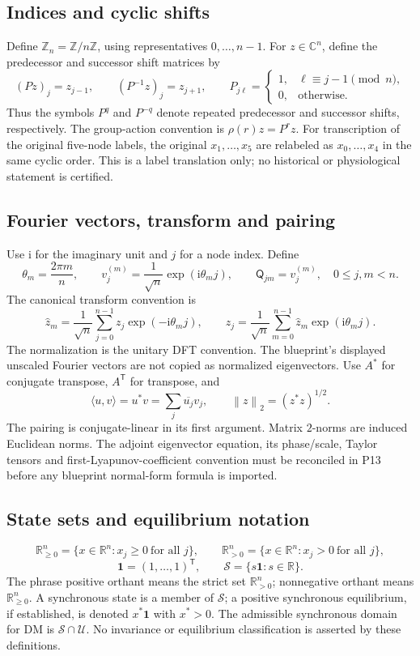 \documentclass[11pt]{article}
\newcommand{\R}{\mathbb{R}}
\newcommand{\C}{\mathbb{C}}
\newcommand{\Z}{\mathbb{Z}}
\newcommand{\Zn}{\mathbb{Z}_n}
\newcommand{\one}{\mathbf{1}}
\newcommand{\ii}{\mathrm{i}}
\newcommand{\DM}{\mathrm{DM}}
\newcommand{\Sync}{\mathcal{S}}
\newcommand{\Orth}{\R_{\geq 0}^{n}}
\newcommand{\PosOrth}{\R_{>0}^{n}}
\newcommand{\Domain}{\mathcal{U}}
\newcommand{\Fourier}{\mathsf{Q}}
\newcommand{\inner}[2]{\langle #1,#2\rangle}
\newcommand{\norm}[1]{\left\lVert #1\right\rVert}
\theoremstyle{definition}
\theoremstyle{remark}
\begin{document}
\subsection{Indices and cyclic shifts}
Define $\Zn=\Z/n\Z$, using representatives $0,\ldots,n-1$.
For $z\in\C^n$, define the predecessor and successor shift matrices by
\[
(Pz)_j=z_{j-1},\qquad(P^{-1}z)_j=z_{j+1},\qquad
P_{j\ell}=\begin{cases}1,&\ell\equiv j-1\pmod n,\\0,&\text{otherwise.}\end{cases}
\]
Thus the symbols $P^q$ and $P^{-q}$ denote repeated predecessor and successor
shifts, respectively. The group-action convention is $\rho(r)z=P^r z$.
For transcription of the original five-node labels, the original $x_1,\ldots,x_5$
are relabeled as $x_0,\ldots,x_4$ in the same cyclic order. This is a label
translation only; no historical or physiological statement is certified.

\subsection{Fourier vectors, transform and pairing}
Use $\ii$ for the imaginary unit and $j$ for a node index. Define
\[
\theta_m=\frac{2\pi m}{n},\qquad
v^{(m)}_j=\frac{1}{\sqrt n}\exp(\ii\theta_m j),\qquad
\Fourier_{jm}=v^{(m)}_j,\quad 0\leq j,m<n.
\]
The canonical transform convention is
\[
\widehat z_m=\frac{1}{\sqrt n}\sum_{j=0}^{n-1}
    z_j\exp(-\ii\theta_m j),\qquad
z_j=\frac{1}{\sqrt n}\sum_{m=0}^{n-1}
    \widehat z_m\exp(\ii\theta_m j).
\]
The normalization is the unitary DFT convention. The blueprint's displayed
unscaled Fourier vectors are not copied as normalized eigenvectors.
Use $A^*$ for conjugate transpose, $A^{\mathsf T}$ for transpose, and
\[
\inner{u}{v}=u^*v=\sum_j\overline{u_j}v_j,
\qquad \norm{z}_2=(z^*z)^{1/2}.
\]
The pairing is conjugate-linear in its first argument. Matrix $2$-norms are
induced Euclidean norms. The adjoint eigenvector equation, its phase/scale,
Taylor tensors and first-Lyapunov-coefficient convention must be reconciled
in P13 before any blueprint normal-form formula is imported.

\subsection{State sets and equilibrium notation}
\[
\Orth=\{x\in\R^n:x_j\geq0\ \text{for all }j\},\qquad
\PosOrth=\{x\in\R^n:x_j>0\ \text{for all }j\},
\]
\[
\one=(1,\ldots,1)^{\mathsf T},\qquad
\Sync=\{s\one:s\in\R\}.
\]
The phrase positive orthant means the strict set $\PosOrth$; nonnegative
orthant means $\Orth$. A synchronous state is a member of $\Sync$; a positive
synchronous equilibrium, if established, is denoted $x^*\one$ with $x^*>0$.
The admissible synchronous domain for $\DM$ is $\Sync\cap\Domain$.
No invariance or equilibrium classification is asserted by these definitions.
\end{document}
